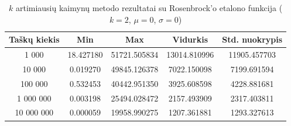 \begin{table}[H]
    \centering
    \begin{tabular}{|c|c|c|c|c|}
        \hline
        \textbf{Taškų kiekis} & \textbf{Min} & \textbf{Max} & \textbf{Vidurkis} & \textbf{Std. nuokrypis} \\ \hline
        1 000        & 18.427180 & 51721.505834 & 13014.810996 & 11905.457703 \\ \hline
        10 000       & 0.019270 & 49845.126378 & 7022.150098 & 7199.691594 \\ \hline
        100 000      & 0.532453 & 40442.951350 & 3925.608598 & 4228.881681 \\ \hline
        1 000 000    & 0.003198 & 25494.028472 & 2157.493909 & 2317.403811 \\ \hline
        10 000 000   & 0.000059 & 19958.990275 & 1207.361881 & 1293.327613 \\ \hline
    \end{tabular}
    \caption{$k$ artimiausių kaimynų metodo rezultatai su Rosenbrock'o etalono funkcija ($k = 2$, $\mu = 0$, $\sigma = 0$)}
\end{table}